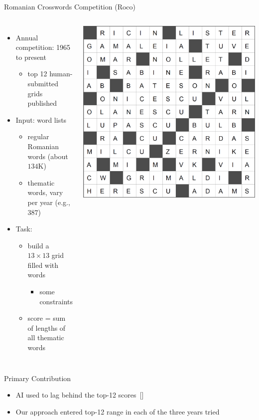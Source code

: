 \documentclass[aspectratio=169,usenames,dvipsnames]{beamer}
\newcommand{\tcg}[1]{\textcolor{m5}{#1}}
\newcommand{\tcm}[1]{\textcolor{m7}{#1}}
\newcommand{\bei}{\begin{itemize}}
\newcommand{\eei}{\end{itemize}}
\newcommand{\ie}{\item}
\numberwithin{equation}{section}
\numberwithin{theorem}{section}
\numberwithin{lem}{section}
\numberwithin{df}{section}
\begin{document}
\begin{frame}{Romanian Crosswords Competition ({\sc Roco})}

\begin{columns}
\bei
\ie Annual competition: 1965 to present
\bei 
\ie top 12 human-submitted grids published
\eei

\bigskip

\ie Input: word lists
\bei
\ie regular Romanian words (about $134$K)
\ie thematic words, vary per year (e.g., $387$)
\eei

\bigskip

\ie Task:
\bei 
\ie build a $13\times13$ grid filled with words
\bei
\ie some constraints
\eei
\ie score = sum of lengths of all thematic words
\eei

\eei

\includegraphics[width=\columnwidth]{figs/2013b.png}
\end{columns}
\end{frame}


\begin{frame}{Primary Contribution}

\bei

\ie \tcm{AI used to lag behind the top-12 scores~[\cite{DBLP:conf/cig/BulitkoB21}]}

\bigskip

\bigskip


\ie \tcg{Our approach entered top-12 range in each of the three years tried}

\eei

\end{frame}
\end{document}
